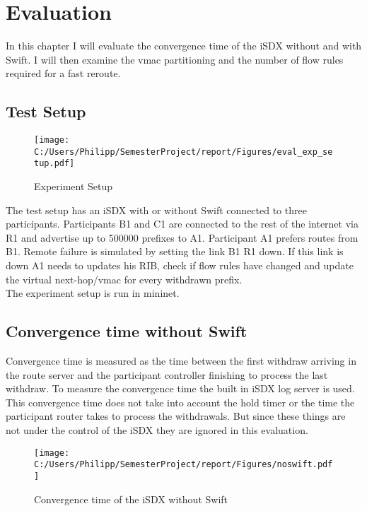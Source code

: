 \chapter{\label{chapter 4}Evaluation}

In this chapter I will evaluate the convergence time of the iSDX without and with Swift.
I will then examine the vmac partitioning and the number of flow rules required for a fast reroute.

\section{\label{chapter4:Test Setup}Test Setup}

\begin{figure}[h]
\center
\texttt{[image: C:/Users/Philipp/SemesterProject/report/Figures/eval\_exp\_setup.pdf]}
\caption{Experiment Setup}
\end{figure}

The test setup has an iSDX with or without Swift connected to three participants. Participants B1 and C1 are connected to the rest of the internet via R1 and advertise up to 500000 prefixes to A1. Participant A1 prefers routes from B1. Remote failure is simulated by setting the link B1 R1 down. If this link is down A1 needs to updates his RIB, check if flow rules have changed and update the virtual next-hop/vmac for every withdrawn prefix.\\ 
The experiment setup is run in mininet. 



\section{\label{chapter4:Convergence time without Swift}Convergence time without Swift}

Convergence time is measured as the time between the first withdraw arriving in the route server and the participant controller finishing to process the last withdraw. To measure the convergence time the built in iSDX log server is used.\\
This convergence time does not take into account the hold timer or the time the participant router takes to process the withdrawals. But since these things are not under the control of the iSDX they are ignored in this evaluation.

\begin{figure}[h]
\center
\texttt{[image: C:/Users/Philipp/SemesterProject/report/Figures/noswift.pdf]}
\caption{Convergence time of the iSDX without Swift}
\end{figure}

